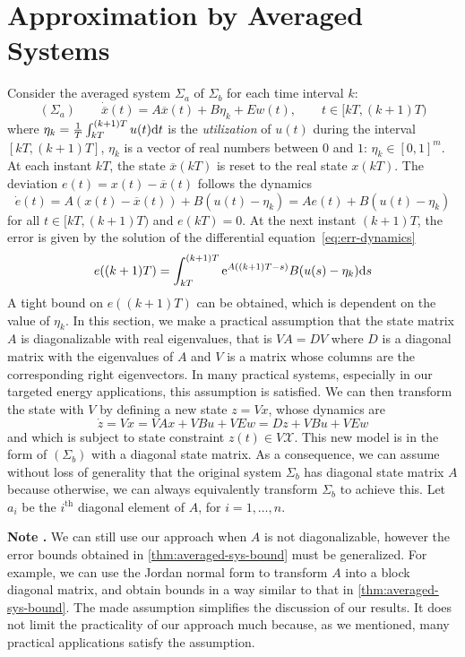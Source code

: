 \section{Approximation by Averaged
Systems}\label{sec:averaged-system}

Consider the averaged system $\Sigma_a$ of $\Sigma_b$ for each time interval
$k$:
\[ (\Sigma_a) \hspace{2em} \dot{\overbar{x}} (t) = A \overbar{x} (t) + B
   \eta_k + Ew (t), \hspace{2em} t \in [kT, (k + 1) T) \]
where $\eta_k = \frac{1}{T} \int_{kT}^{(k + 1) T} u (t) \mathrm{d} t$ is the
{\emph{utilization}} of $u (t)$ during the interval $[kT, (k + 1) T]$,
$\eta_k$ is a vector of real numbers between $0$ and $1$: $\eta_k \in [0,
1]^m$. At each instant $kT$, the state $\overbar{x} (kT)$ is reset to the
real state $x (kT)$. The deviation $e (t) = x (t) - \overbar{x} (t)$ follows
the dynamics
\begin{equation}
  \dot{e} (t) = A (x (t) - \overbar{x} (t)) + B (u (t) - \eta_k) = Ae (t) + B
  (u (t) - \eta_k) \label{eq:err-dynamics}
\end{equation}
for all $t \in [kT, (k + 1) T)$ and $e (kT) = 0$. At the next instant $(k + 1)
T$, the error is given by the solution of the differential equation~\eqref{eq:err-dynamics}
\[ e ((k + 1) T) = \int_{kT}^{(k + 1) T} \mathrm{e}^{A ((k + 1) T - s)} B (u (s) -
   \eta_k) \mathrm{d} s \]
A tight bound on $e ((k + 1) T)$ can be obtained, which is dependent on the
value of $\eta_k$. In this section, we make a practical assumption that the
state matrix $A$ is diagonalizable with real eigenvalues, that is $VA = DV$
where $D$ is a diagonal matrix with the eigenvalues of $A$ and $V$ is a matrix
whose columns are the corresponding right eigenvectors. In many practical
systems, especially in our targeted energy applications, this assumption is
satisfied. We can then transform the state with $V$ by defining a new state $z
= Vx$, whose dynamics are
\[ \dot{z} = V \dot{x} = VAx + VBu + VEw = Dz + VBu + VEw \]
and which is subject to state constraint $z (t) \in V\mathcal{X}$. This new
model is in the form of $(\Sigma_b)$ with a diagonal state matrix. As a
consequence, we can assume without loss of generality that the original system
$\Sigma_b$ has diagonal state matrix $A$ because otherwise, we can always
equivalently transform $\Sigma_b$ to achieve this. Let $a_i$ be the
$i^{\text{th}}$ diagonal element of $A$, for $i = 1, \ldots, n$.

{\noindent}\textbf{Note . }We can still use our approach when $A$ is not
diagonalizable, however the error bounds obtained in
\cref{thm:averaged-sys-bound} must be generalized. For example, we can
use the Jordan normal form to transform $A$ into a block diagonal matrix, and
obtain bounds in a way similar to that in
\cref{thm:averaged-sys-bound}. The made assumption simplifies the
discussion of our results. It does not limit the practicality of our approach
much because, as we mentioned, many practical applications satisfy the
assumption.{\hspace*{\fill}}{\medskip}

